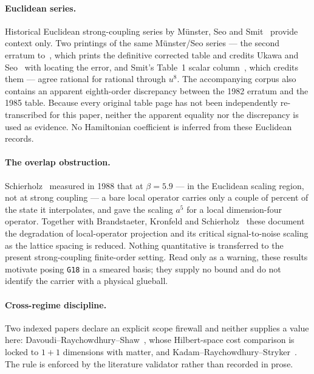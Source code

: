 \documentclass[11pt]{article}
\theoremstyle{plain}
\theoremstyle{definition}
\theoremstyle{remark}
\newcommand{\chk}[1]{}
\begin{document}
\paragraph{Euclidean series.} Historical Euclidean strong-coupling series by
M\"unster, Seo and Smit~\cite{Munster1981,Seo1982,Smit1982,Munster1983,Munster1985}
provide context only. Two printings of the same M\"unster/Seo series --- the
second erratum to~\cite{Munster1981}, which prints the definitive corrected
table and credits Ukawa and Seo~\cite{Seo1982} with locating the error, and
Smit's Table~1 scalar column~\cite{Smit1982}, which credits them --- agree
rational for rational through $u^8$. The accompanying corpus also contains an
apparent eighth-order discrepancy between the 1982 erratum and the 1985
table. Because every original table page has not been
independently re-transcribed for this paper, neither the apparent equality nor
the discrepancy is used as evidence. No Hamiltonian coefficient is inferred
from these Euclidean records.
\chk{the errata-resolved Euclidean series is doubly sourced, transcription for transcription}
\chk{FINDING: Munster's 1985 table shifts his 1982 erratum at eighth order}

\paragraph{The overlap obstruction.} Schierholz~\cite{Schierholz1988}
measured in 1988 that at $\beta=5.9$ --- in the Euclidean scaling region, not
at strong coupling --- a bare local operator carries only a couple of percent
of the state it interpolates, and gave the scaling $a^5$ for a local
dimension-four operator. Together with Brandstaeter, Kronfeld and
Schierholz~\cite{BKS1990} these document the degradation of local-operator
projection and its critical signal-to-noise scaling as the lattice spacing is
reduced. Nothing quantitative is transferred to the
present strong-coupling finite-order setting. Read only as a warning, these
results motivate posing \texttt{G18} in a smeared basis; they supply no bound
and do not identify the carrier with a physical glueball.
\chk{the overlap obstruction was published in 1988, and it scales}

\paragraph{Cross-regime discipline.} Two indexed papers declare an explicit
scope firewall and neither supplies a value here:
Davoudi--Raychowdhury--Shaw~\cite{DRS2021}, whose Hilbert-space cost comparison
is locked to $1{+}1$ dimensions with matter, and
Kadam--Raychowdhury--Stryker~\cite{KRS2023}. The rule is enforced by the
literature validator rather than recorded in prose.
\chk{a cross-regime paper never supplies a value}
\end{document}
